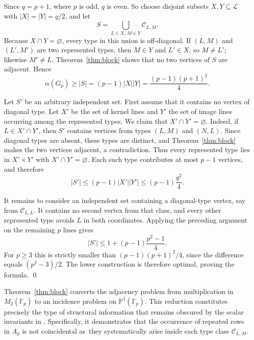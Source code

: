 \documentclass[12pt]{article}
\renewenvironment{proof}{{\bf \noindent Proof.}}{\qed}
\theoremstyle{definition}
\newcommand{\F}{\mathbb{F}}
\newcommand{\PP}{\mathbb{P}}
\newcommand{\calL}{\mathcal{L}}
\newcommand{\calC}{\mathcal{C}}
\begin{document}
	\begin{proof}
		Since $q=p+1$, where $p$ is odd, $q$ is even. So choose disjoint subsets $X,Y\subseteq\calL$ with $|X|=|Y|=q/2$, and let
		$$
		S=\bigcup_{L\in X,\,M\in Y}\calC_{L,M}.
		$$
		Because $X\cap Y=\varnothing$, every type in this union is off-diagonal. If $(L,M)$ and $(L',M')$ are two represented types, then $M\in Y$ and $L'\in X$, so $M\neq L'$; likewise $M'\neq L$. Theorem~\ref{thm:block} shows that no two vertices of $S$ are adjacent. Hence
		$$
		\alpha(G_p)\ge |S|=(p-1)|X||Y|=\frac{(p-1)(p+1)^2}{4}.
		$$
		
		Let $S'$ be an arbitrary independent set. First assume that it contains no vertex of diagonal type. Let $X'$ be the set of kernel lines and $Y'$ the set of image lines occurring among the represented types. We claim that $X'\cap Y'=\varnothing$. Indeed, if $L\in X'\cap Y'$, then $S'$ contains vertices from types $(L,M)$ and $(N,L)$. Since diagonal types are absent, these types are distinct, and Theorem~\ref{thm:block} makes the two vertices adjacent, a contradiction. Thus every represented type lies in $X'\times Y'$ with $X'\cap Y'=\varnothing$. Each such type contributes at most $p-1$ vertices, and therefore
		$$
		|S'|\le(p-1)|X'||Y'|\le(p-1)\frac{q^2}{4}.
		$$
		
		It remains to consider an independent set containing a diagonal-type vertex, say from $\calC_{L,L}$. It contains no second vertex from that class, and every other represented type avoids $L$ in both coordinates. Applying the preceding argument on the remaining $p$ lines gives
		$$
		|S'|\le 1+(p-1)\frac{p^2-1}{4}.
		$$
		For $p\ge3$ this is strictly smaller than $(p-1)(p+1)^2/4$, since the difference equals $(p^2-3)/2$. The lower construction is therefore optimal, proving the formula.
	\end{proof}
	
	\medskip
	Theorem~\ref{thm:block} converts the adjacency problem from multiplication in $M_2(\F_p)$ to an incidence problem on $\PP^1(\F_p)$. This reduction constitutes precisely the type of structural information that remains obscured by the scalar invariants in \cite{grau2017}. Specifically, it demonstrates that the occurrence of repeated rows in $A_p$ is not coincidental as they systematically arise inside each type class $\calC_{L,M}$. 
	
\end{document}
